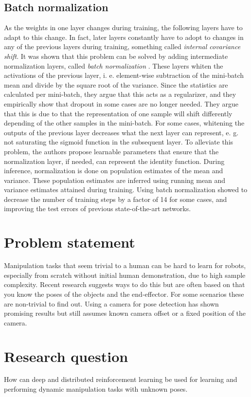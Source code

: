 \subsection{Batch normalization}

As the weights in one layer changes during training, the following layers have
to adapt to this change. In fact, later layers constantly have to adopt to
changes in any of the previous layers during training, something called
\textit{internal covariance shift}. It was shown that this problem can be
solved by adding intermediate normalization layers, called \textit{batch
normalization} \cite{ioffe2015batch}. These layers whiten the activations of
the previous layer, i. e. element-wise subtraction of the mini-batch mean and
divide by the square root of the variance. Since the statistics are calculated
per mini-batch, they argue that this acts as a regularizer, and they
empirically show that dropout in some cases are no longer needed. They argue
that this is due to that the representation of one sample will shift
differently depending of the other samples in the mini-batch. For some cases,
whitening the outputs of the previous layer decreases what the next layer can
represent, e. g. not saturating the sigmoid function in the subsequent layer.
To alleviate this problem, the authors propose learnable parameters that ensure
that the normalization layer, if needed, can represent the identity function.
During inference, normalization is done on population estimates of the mean and
variance. These population estimates are inferred using running mean and
variance estimates attained during training. Using batch normalization showed
to decrease the number of training steps by a factor of 14 for some cases, and
improving the test errors of previous state-of-the-art networks.

\section{Problem statement}

Manipulation tasks that seem trivial to a human can be hard to learn for
robots, especially from scratch without initial human demonstration, due to
high sample complexity. Recent research suggests ways to do this but are often
based on that you know the poses of the objects and the end-effector. For some
scenarios these are non-trivial to find out. Using a camera for pose detection
has shown promising results but still assumes known camera offset or a fixed
position of the camera.

\section{Research question}

How can deep and distributed reinforcement learning be used for learning and
performing dynamic manipulation tasks with unknown poses.
